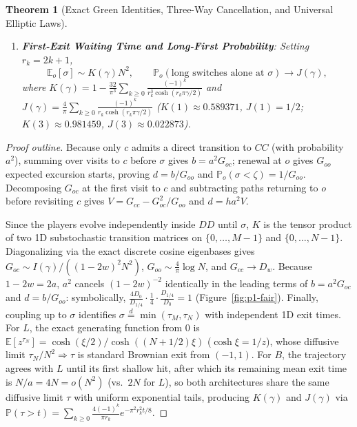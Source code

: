 \documentclass[11pt,reqno]{amsart}
\newtheorem{theorem}{Theorem}[section]
\theoremstyle{definition}
\theoremstyle{remark}
\newcommand{\E}{\mathbb{E}}
\newcommand{\Prob}{\mathbb{P}}
\begin{document}
\begin{theorem}[Exact Green Identities, Three-Way Cancellation, and Universal Elliptic Laws]
\begin{enumerate}
  \item \textbf{First-Exit Waiting Time and Long-First Probability}: Setting $r_k = 2k+1$,
  \[
    \E_o[\sigma] \sim K(\gamma) N^2, \qquad
    \Prob_o(\text{long switches alone at }\sigma) \longrightarrow J(\gamma),
  \]
  where $K(\gamma) = 1 - \frac{32}{\pi^3}\sum_{k\ge 0}\frac{(-1)^k}{r_k^3 \cosh(r_k\pi\gamma/2)}$ and $J(\gamma) = \frac{4}{\pi}\sum_{k\ge 0}\frac{(-1)^k}{r_k \cosh(r_k\pi\gamma/2)}$ ($K(1) \approx 0.589371$, $J(1) = 1/2$; $K(3) \approx 0.981459$, $J(3) \approx 0.022873$).
\end{enumerate}
\end{theorem}

\begin{proof}[Proof outline]
Because only $c$ admits a direct transition to $CC$ (with probability $a^2$), summing over visits to $c$ before $\sigma$ gives $b = a^2 G_{oc}$; renewal at $o$ gives $G_{oo}$ expected excursion starts, proving $d = b/G_{oo}$ and $\Prob_o(\sigma<\zeta) = 1/G_{oo}$. Decomposing $G_{oc}$ at the first visit to $c$ and subtracting paths returning to $o$ before revisiting $c$ gives $V = G_{cc} - G_{oc}^2/G_{oo}$ and $d = h a^2 V$.

Since the players evolve independently inside $DD$ until $\sigma$, $K$ is the tensor product of two 1D substochastic transition matrices on $\{0,\dots,M-1\}$ and $\{0,\dots,N-1\}$. Diagonalizing via the exact discrete cosine eigenbases gives $G_{oc} \sim I(\gamma)/((1-2w)^2 N^2)$, $G_{oo} \sim \frac{4}{\pi}\log N$, and $G_{cc} \to D_w$. Because $1-2w = 2a$, $a^2$ cancels $(1-2w)^{-2}$ identically in the leading terms of $b = a^2 G_{oc}$ and $d = b/G_{oo}$: symbolically, $\frac{4 D_0}{D_{1/4}} \cdot \frac{1}{4} \cdot \frac{D_{1/4}}{D_0} = 1$ (Figure~\ref{fig:p1-fair}). Finally, coupling up to $\sigma$ identifies $\sigma \stackrel{d}{=} \min(\tau_M, \tau_N)$ with independent 1D exit times. For $L$, the exact generating function from $0$ is $\E[z^{\tau_N}] = \cosh(\xi/2)/\cosh((N+1/2)\xi)$ ($\cosh\xi=1/z$), whose diffusive limit $\tau_N/N^2 \Rightarrow \tau$ is standard Brownian exit from $(-1,1)$. For $B$, the trajectory agrees with $L$ until its first shallow hit, after which its remaining mean exit time is $N/a = 4N = o(N^2)$ (vs.\ $2N$ for $L$), so both architectures share the same diffusive limit $\tau$ with uniform exponential tails, producing $K(\gamma)$ and $J(\gamma)$ via $\Prob(\tau > t) = \sum_{k\ge 0} \frac{4(-1)^k}{\pi r_k} e^{-\pi^2 r_k^2 t/8}$.
\end{proof}
\end{document}
